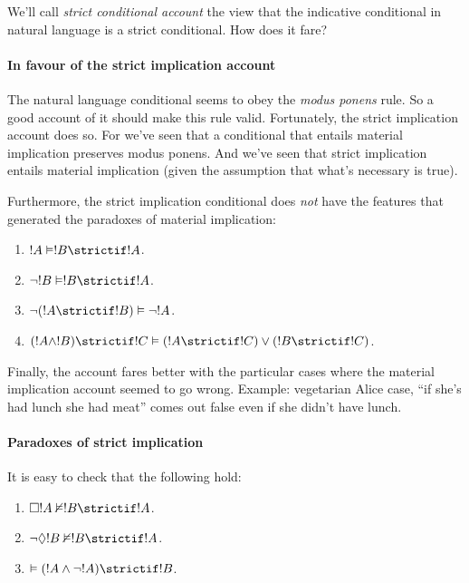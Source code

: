 \documentclass[../../../include/open-logic-section]{subfiles}
\begin{document}
We'll call \emph{strict conditional account} the view that the indicative conditional in natural language is a strict conditional. How does it fare?

\paragraph*{In favour of the strict implication account}

The natural language conditional seems to obey the \emph{modus ponens} rule. So a good account of it should make this rule valid. Fortunately, the strict implication account does so. For we've seen that a conditional that entails material implication preserves modus ponens. And we've seen that strict implication entails material implication (given the assumption that what's necessary is true).

Furthermore, the strict implication conditional does \emph{not} have the features that generated the paradoxes of material implication:

\begin{enumerate}
	\item $!A \Entails !B \strictif !A$.
	\item $\lnot !B \Entails !B \strictif !A$.
	\item $\lnot (!A \strictif !B) \Entails \lnot !A$.
	\item $(!A \land !B) \strictif !C \Entails (!A \strictif !C) \lor (!B \strictif !C)$.
\end{enumerate}

Finally, the account fares better with the particular cases where the material implication account seemed to go wrong. Example: vegetarian Alice case, ``if she's had lunch she had meat'' comes out false even if she didn't have lunch.

\paragraph*{Paradoxes of strict implication}

It is easy to check that the following hold:

\begin{enumerate}
	\item $\Box !A \Entails/ !B \strictif !A$.
	\item $\lnot \Diamond !B \Entails/ !B \strictif !A$.
	\item $\Entails (!A \land \lnot !A) \strictif !B$.
\end{enumerate}
\end{document}
